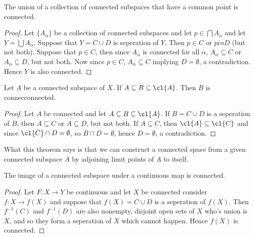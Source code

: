 \begin{theorem}\label{3.1.4}
    The union of a collection of connected subspaces that have a common point is connected.
\end{theorem}
\begin{proof}
    Let $\{A_{\alpha}\}$ be a collection of connected subspaces and let $p \in \bigcap{A_{\alpha}}$
    and let $Y=\bigcup{A_{\alpha}}$. Suppose that $Y=C \cup D$ is seperation of  $Y$. Then  $p \in
    C$ or  $p in D$  (but not both). Suppose that $p \in C$, then since $A_{\alpha}$ is connected
    for all $\alpha$,  $A_{\alpha} \subseteq C$ or $A_{\alpha} \subseteq D$, but not both. Now since
    $p \in C$,  $A_{\alpha} \subseteq C$ implying $D=\emptyset$, a contradiction. Hence  $Y$ is also
    connected.
\end{proof}

\begin{theorem}\label{3.1.5}
    Let $A$ be a connected subspace of  $X$. If  $A \subseteq B \subseteq \cl{A}$. Then $B$ is
    connecconnected.
\end{theorem}
\begin{proof}
    Let $A$ be connected and let  $A \subseteq B \subseteq \cl{A}$. If $B=C \cup D$ is a seperation
    of  $B$, then  $A \subseteq C$ or  $A \subseteq D$, but not both. If  $A \subseteq C$, then
    $\cl{A} \subseteq \cl{C}$ and since $\cl{C} \cap D=\emptyset$, so $B \cap D=\emptyset$, hence
    $D=\emptyset$, a contradiction.
\end{proof}
\begin{remark}
    What this theorem says is that we can construct a connected space from a given connected
    subspace $A$ by adjoining limit points of $A$ to itself.
\end{remark}

\begin{theorem}\label{3.1.6}
    The image of a connected subspace under a continuous map is connected.
\end{theorem}
\begin{proof}
    Let $F:X \rightarrow Y$ be continuous and let $X$ be connected consider
    $f:X \rightarrow f(X)$ and suppose that $f(X)=C \cup D$ is a seperation of $f(X)$. Then
    $f^{-1}(C)$ and $f^{-1}(D)$ are also nonempty, disjoint open sets of $X$ who's union is  $X$,
    and so they form a seperation of  $X$ which cannot happen. Hence  $f(X)$ is connected.
\end{proof}

